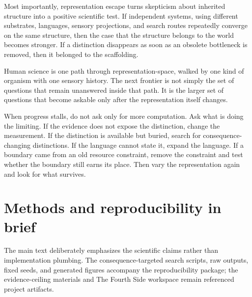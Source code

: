 \documentclass[11pt]{article}
\begin{document}
Most importantly, representation escape turns skepticism about inherited structure into a positive scientific test. If independent systems, using different substrates, languages, sensory projections, and search routes repeatedly converge on the same structure, then the case that the structure belongs to the world becomes stronger. If a distinction disappears as soon as an obsolete bottleneck is removed, then it belonged to the scaffolding.

Human science is one path through representation-space, walked by one kind of organism with one sensory history. The next frontier is not simply the set of questions that remain unanswered inside that path. It is the larger set of questions that become askable only after the representation itself changes.

\begin{keybox}
When progress stalls, do not ask only for more computation. Ask what is doing the limiting. If the evidence does not expose the distinction, change the measurement. If the distinction is available but buried, search for consequence-changing distinctions. If the language cannot state it, expand the language. If a boundary came from an old resource constraint, remove the constraint and test whether the boundary still earns its place. Then vary the representation again and look for what survives.
\end{keybox}

\appendix
\section{Methods and reproducibility in brief}
The main text deliberately emphasizes the scientific claims rather than implementation plumbing. The consequence-targeted search scripts, raw outputs, fixed seeds, and generated figures accompany the reproducibility package; the evidence-ceiling materials and The Fourth Side workspace remain referenced project artifacts.
\end{document}
